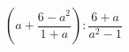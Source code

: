 \begin{ex}[type=expression]
	\begin{condition}
		\(\left( a+\dfrac{6-a^2}{1+a} \right):\dfrac{6+a}{a^2-1}\)
	\end{condition}
\end{ex}